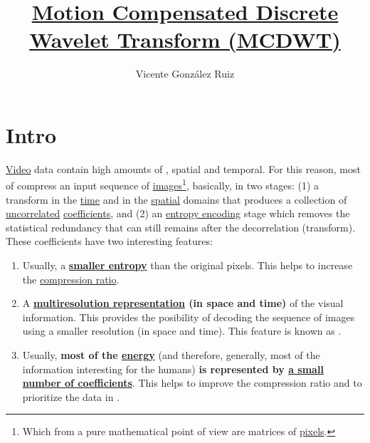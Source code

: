 \title{\href{https://github.com/Sistemas-Multimedia/MCDWT}{Motion Compensated Discrete Wavelet Transform (MCDWT)}}
\author{Vicente González Ruiz}
\maketitle
\tableofcontents

\section{Intro}

\href{https://en.wikipedia.org/wiki/Video}{Video} data contain high
amounts of , spatial and temporal. For
this reason, most of 
compress an input sequence of
\href{https://en.wikipedia.org/wiki/Digital_image}{images}\footnote{Which
  from a pure mathematical point of view are matrices of
  \href{https://en.wikipedia.org/wiki/Pixel}{pixels}.}, basically, in
two stages: (1) a transform in the
\href{https://en.wikipedia.org/wiki/Time_domain}{time} and in the
\href{https://www.quora.com/What-is-spatial-domain-in-image-processing}{spatial}
domains that produces a collection of
\href{https://en.wikipedia.org/wiki/Decorrelation}{uncorrelated}
\href{https://en.wikipedia.org/wiki/Discrete_wavelet_transform}{coefficients},
and (2) an
\href{https://en.wikipedia.org/wiki/Entropy_encoding}{entropy
  encoding} stage which removes the statistical redundancy that can
still remains after the decorrelation (transform). These coefficients
have two interesting features:
\begin{enumerate}
\item Usually, a \textbf{
  \href{https://vicente-gonzalez-ruiz.github.io/symbol_compression/}{smaller
  entropy}} than the original pixels. This helps to increase
  the \href{https://en.wikipedia.org/wiki/Data_compression_ratio}{compression
    ratio}.
\item A
  \textbf{\href{https://en.wikipedia.org/wiki/Image_resolution}{multiresolution
      representation} (in space and time)} of the visual
  information. This provides the posibility of decoding the sequence
  of images using a smaller resolution (in space and time). This
  feature is known as .
\item Usually, \textbf{most of the
  \href{https://en.wikipedia.org/wiki/Energy_(signal_processing)}{energy}}
  (and therefore, generally, most of the information interesting for
  the humans) \textbf{is represented by
    \href{https://vicente-gonzalez-ruiz.github.io/image_transformations_for_coding}{a
      small number of coefficients}}. This helps to improve the
  compression ratio and to prioritize the data in
  .
\end{enumerate}

